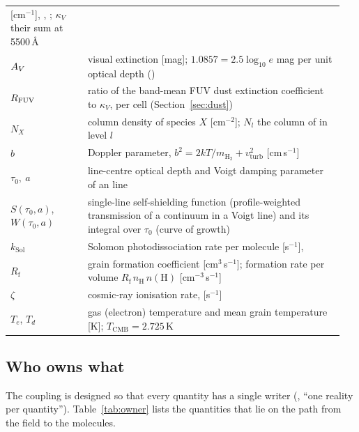 \begin{longtable}{@{}L{0.22\linewidth}L{0.73\linewidth}@{}}
         [cm$^{-1}$], , ; $\kappa_V$ their sum at 5500\,\AA \\
$A_{V}$ & visual extinction [mag]; $1.0857 = 2.5\log_{10}e$ mag per unit optical depth () \\
$R_{\mathrm{FUV}}$ & ratio of the band-mean FUV dust extinction coefficient to $\kappa_V$, per cell (Section~\ref{sec:dust}) \\
$N_X$ & column density of species $X$ [cm$^{-2}$]; $N_l$ the column of \Htwo{} in level $l$ \\
$b$ & Doppler parameter, $b^2 = 2kT/m_{\mathrm{H_2}} + v_{\mathrm{turb}}^2$ [cm\,s$^{-1}$] \\
$\tau_0,\ a$ & line-centre optical depth and Voigt damping parameter of an \Htwo{} line \\
$S(\tau_0,a)$, $W(\tau_0,a)$ & single-line self-shielding function (profile-weighted transmission of a continuum in a Voigt line) and its integral over $\tau_0$ (curve of growth) \\
$k_{\mathrm{Sol}}$ & Solomon photodissociation rate per \Htwo{} molecule [s$^{-1}$],  \\
$R_{\mathrm{f}}$ & \Htwo{} grain formation coefficient [cm$^3$\,s$^{-1}$]; formation rate per volume $R_{\mathrm f}\,n_{\mathrm H}\,n(\mathrm H)$ [cm$^{-3}$\,s$^{-1}$] \\
$\zeta$ & cosmic-ray ionisation rate,  [s$^{-1}$] \\
$T_e$, $T_d$ & gas (electron) temperature and mean grain temperature [K]; $T_{\mathrm{CMB}}=2.725$\,K \\
\bottomrule
\end{longtable}

\subsection{Who owns what}
\label{sec:ownership}

The coupling is designed so that every quantity has a single writer
(, ``one reality per quantity''). Table~\ref{tab:owner}
lists the quantities that lie on the path from the field to the molecules.

